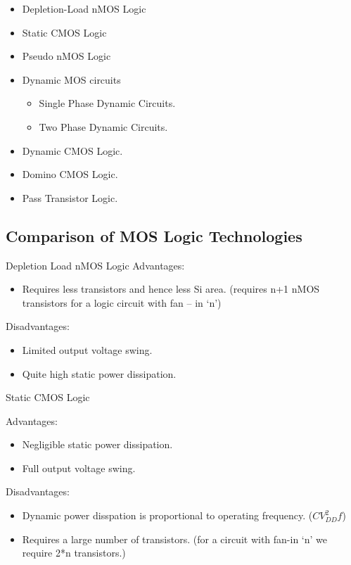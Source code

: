 \documentclass[12pt, letterpaper]{article}
\begin{document}
\begin{itemize}
    \item Depletion-Load nMOS Logic
    \item Static CMOS Logic
    \item Pseudo nMOS Logic
    \item Dynamic MOS circuits
    \begin{itemize}
        \item Single Phase Dynamic Circuits.
        \item Two Phase Dynamic Circuits.
    \end{itemize}
    \item Dynamic CMOS Logic.
    \item Domino CMOS Logic.
    \item Pass Transistor Logic.
\end{itemize}

\subsection{Comparison of MOS Logic Technologies}

							Depletion Load nMOS Logic
Advantages:
\begin{itemize}
    \item Requires less transistors and hence less Si area. (requires n+1 nMOS transistors for a logic circuit with fan – in ‘n’)
\end{itemize}

Disadvantages:
\begin{itemize}
    \item Limited output voltage swing.
    \item Quite high static power dissipation.
\end{itemize}

							Static CMOS Logic

Advantages:
\begin{itemize}
    \item Negligible static power dissipation.
    \item Full output voltage swing.
\end{itemize}

Disadvantages:
\begin{itemize}
    \item Dynamic power disspation is proportional to operating frequency. ($CV_{DD}^2 f$)
    \item Requires a large number of transistors. (for a circuit with fan-in ‘n’ we require 2*n transistors.)
\end{itemize}
\end{document}
